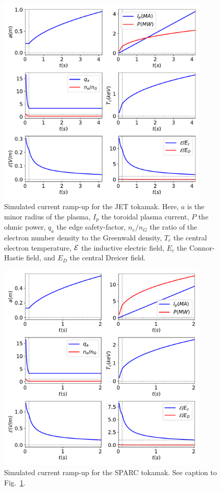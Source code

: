\documentclass{iopjournal}
\begin{document}
\begin{figure}
\centerline{\includegraphics[width=0.9\textwidth]{Figure4.pdf}}
\caption{Simulated current ramp-up for the JET tokamak. Here, $a$ is the minor radius of the plasma, $I_p$ the toroidal plasma
current, $P$ the ohmic power, $q_a$ the edge safety-factor, $n_e/n_G$ the ratio of the electron number density to the Greenwald density, $T_c$ the central electron temperature, ${\cal E}$ the
inductive electric field, $E_c$ the Connor-Hastie field, and $E_D$ the central Dreicer field. }\label{fig4}
\end{figure}

\begin{figure}
\centerline{\includegraphics[width=0.9\textwidth]{Figure5.pdf}}
\caption{Simulated current ramp-up for the SPARC tokamak. See caption to Fig.~\ref{fig4}.}\label{fig5}
\end{figure}
\end{document}
